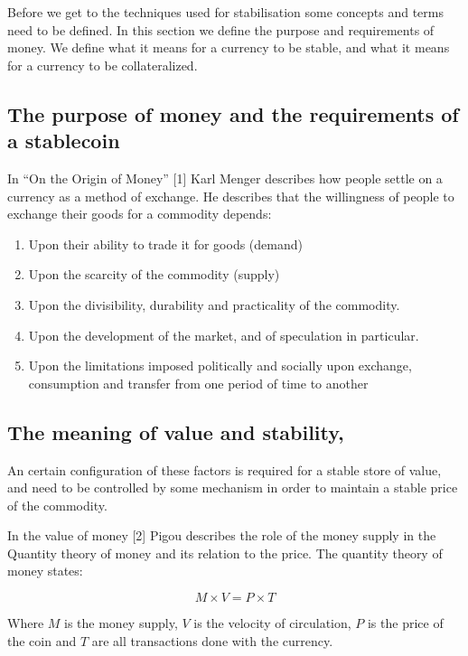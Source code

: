 \documentclass[english,]{IEEEtran}
\providecommand{\tightlist}{%
  \setlength{\itemsep}{0pt}\setlength{\parskip}{0pt}}
\begin{document}
Before we get to the techniques used for stabilisation some concepts and
terms need to be defined. In this section we define the purpose and
requirements of money. We define what it means for a currency to be
stable, and what it means for a currency to be collateralized.

\subsection{The purpose of money and the requirements of a
stablecoin}\label{the-purpose-of-money-and-the-requirements-of-a-stablecoin}

In ``On the Origin of Money'' {[}1{]} Karl Menger describes how people
settle on a currency as a method of exchange. He describes that the
willingness of people to exchange their goods for a commodity depends:

\begin{enumerate}
\def\labelenumi{\arabic{enumi}.}
\tightlist
\item
  Upon their ability to trade it for goods (demand)
\item
  Upon the scarcity of the commodity (supply)
\item
  Upon the divisibility, durability and practicality of the commodity.
\item
  Upon the development of the market, and of speculation in particular.
\item
  Upon the limitations imposed politically and socially upon exchange,
  consumption and transfer from one period of time to another
\end{enumerate}

\subsection{The meaning of value and
stability,}\label{the-meaning-of-value-and-stability}

An certain configuration of these factors is required for a stable store
of value, and need to be controlled by some mechanism in order to
maintain a stable price of the commodity.

In the value of money {[}2{]} Pigou describes the role of the money
supply in the Quantity theory of money and its relation to the price.
The quantity theory of money states:

\[ M \times V = P \times T \]

Where \(M\) is the money supply, \(V\) is the velocity of circulation,
\(P\) is the price of the coin and \(T\) are all transactions done with
the currency.
\end{document}
